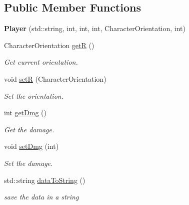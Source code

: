\subsection*{Public Member Functions}
\begin{DoxyCompactItemize}
\item 
\mbox{\label{class_player_a8b76b277ae15eced5d10f59778f8b433}} 
{\bfseries Player} (std\+::string, int, int, int, Character\+Orientation, int)
\item 
\mbox{\label{class_player_abefafc33ac811944c7cac447ac394917}} 
Character\+Orientation \mbox{\hyperlink{class_player_abefafc33ac811944c7cac447ac394917}{getR}} ()
\begin{DoxyCompactList}\small\item\em Get current orientation. \end{DoxyCompactList}\item 
\mbox{\label{class_player_a54836e99012d8345473841d779aea6d3}} 
void \mbox{\hyperlink{class_player_a54836e99012d8345473841d779aea6d3}{setR}} (Character\+Orientation)
\begin{DoxyCompactList}\small\item\em Set the orientation. \end{DoxyCompactList}\item 
\mbox{\label{class_player_a79a5063d16b6d4211fb0653c7d7237da}} 
int \mbox{\hyperlink{class_player_a79a5063d16b6d4211fb0653c7d7237da}{get\+Dmg}} ()
\begin{DoxyCompactList}\small\item\em Get the damage. \end{DoxyCompactList}\item 
\mbox{\label{class_player_a2a18f620b031c8a0d7e0e0fcc66899bd}} 
void \mbox{\hyperlink{class_player_a2a18f620b031c8a0d7e0e0fcc66899bd}{set\+Dmg}} (int)
\begin{DoxyCompactList}\small\item\em Set the damage. \end{DoxyCompactList}\item 
std\+::string \mbox{\hyperlink{class_player_a3bd5a8ec31a4c46b09c4d9642e8d65ee}{data\+To\+String}} ()
\begin{DoxyCompactList}\small\item\em save the data in a string \end{DoxyCompactList}\end{DoxyCompactItemize}


